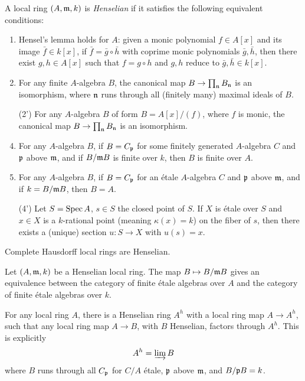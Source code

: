 \documentclass[11pt]{amsart}
\begin{document}
\begin{defn}
    A local ring $(A,\mathfrak{m}, k)$ is \emph{Henselian} if it satisfies the following equivalent conditions:
    \begin{enumerate}
        \item Hensel's lemma holds for $A$: given a monic polynomial $f\in A[x]$ and its image $\bar{f}\in k[x]$, if $\bar{f} = \bar{g}\circ \bar{h}$ with coprime monic polynomials $\bar{g},\bar{h}$, then there exist $g,h\in A[x]$ such that $f = g\circ h$ and $g,h$ reduce to $\bar{g},\bar{h}\in k[x]$.

        \item For any finite $A$-algebra $B$, the canonical map $B\to \prod_{\mathfrak{n}} B_{\mathfrak{n}}$ is an isomorphism, where $\mathfrak{n}$ runs through all (finitely many) maximal ideals of $B$.

        \item[(2')] For any $A$-algebra $B$ of form $B = A[x]/(f)$, where $f$ is monic, the canonical map $B\to \prod_{\mathfrak{n}} B_{\mathfrak{n}}$ is an isomorphism.

        \item For any $A$-algebra $B$, if $B = C_{\mathfrak{p}}$ for some finitely generated $A$-algebra $C$ and $\mathfrak{p}$ above $\mathfrak{m}$, and if $B/\mathfrak{m} B$ is finite over $k$, then $B$ is finite over $A$.

        \item For any $A$-algebra $B$, if $B = C_{\mathfrak{p}}$ for an \'etale $A$-algebra $C$ and $\mathfrak{p}$ above $\mathfrak{m}$, and if $k = B/\mathfrak{m} B$, then $B = A$.

        \item[(4')] Let $S = \operatorname{Spec} A$, $s\in S$ the closed point of $S$. If $X$ is \'etale over $S$ and $x\in X$ is a $k$-rational point (meaning $\kappa(x) = k$) on the fiber of $s$, then there exists a (unique) section $u:S\to X$ with $u(s) = x$.
    \end{enumerate}
\end{defn}

\begin{exm}
    Complete Hausdorff local rings are Henselian.
\end{exm}

\begin{thm}
    Let $(A,\mathfrak{m},k)$ be a Henselian local ring. The map $B \mapsto B/\mathfrak{m} B$ gives an equivalence between the category of finite \'etale algebras over $A$ and the category of finite \'etale algebras over $k$.
\end{thm}

\begin{defn}[Henselization]
    For any local ring $A$, there is a Henselian ring $A^h$ with a local ring map $A\to A^h$, such that any local ring map $A\to B$, with $B$ Henselian, factors through $A^h$. This is explicitly
    \[A^h = \varinjlim B\]
    where $B$ runs through all $C_{\mathfrak{p}}$ for $C/A$ \'etale, $\mathfrak{p}$ above $\mathfrak{m}$, and $B/\mathfrak{p} B = k$.
\end{defn}
\end{document}
